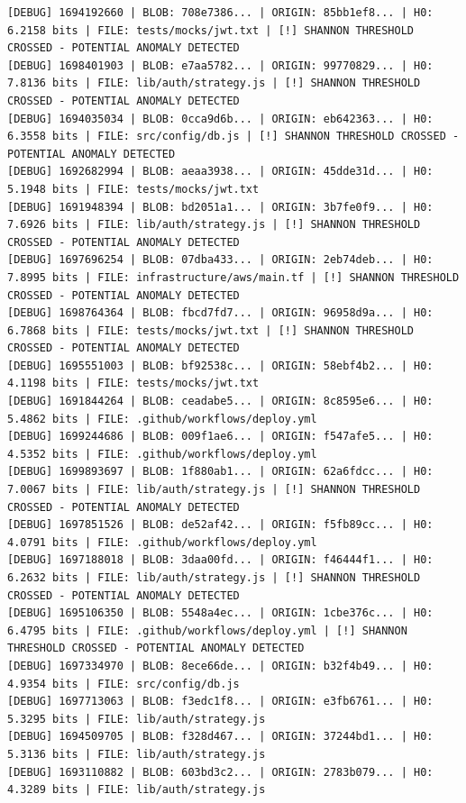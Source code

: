 \documentclass[12pt, a4paper, oneside]{report}
\begin{document}
\begin{lstlisting}[basicstyle=\tiny\ttfamily]
[DEBUG] 1694192660 | BLOB: 708e7386... | ORIGIN: 85bb1ef8... | H0: 6.2158 bits | FILE: tests/mocks/jwt.txt | [!] SHANNON THRESHOLD CROSSED - POTENTIAL ANOMALY DETECTED
[DEBUG] 1698401903 | BLOB: e7aa5782... | ORIGIN: 99770829... | H0: 7.8136 bits | FILE: lib/auth/strategy.js | [!] SHANNON THRESHOLD CROSSED - POTENTIAL ANOMALY DETECTED
[DEBUG] 1694035034 | BLOB: 0cca9d6b... | ORIGIN: eb642363... | H0: 6.3558 bits | FILE: src/config/db.js | [!] SHANNON THRESHOLD CROSSED - POTENTIAL ANOMALY DETECTED
[DEBUG] 1692682994 | BLOB: aeaa3938... | ORIGIN: 45dde31d... | H0: 5.1948 bits | FILE: tests/mocks/jwt.txt
[DEBUG] 1691948394 | BLOB: bd2051a1... | ORIGIN: 3b7fe0f9... | H0: 7.6926 bits | FILE: lib/auth/strategy.js | [!] SHANNON THRESHOLD CROSSED - POTENTIAL ANOMALY DETECTED
[DEBUG] 1697696254 | BLOB: 07dba433... | ORIGIN: 2eb74deb... | H0: 7.8995 bits | FILE: infrastructure/aws/main.tf | [!] SHANNON THRESHOLD CROSSED - POTENTIAL ANOMALY DETECTED
[DEBUG] 1698764364 | BLOB: fbcd7fd7... | ORIGIN: 96958d9a... | H0: 6.7868 bits | FILE: tests/mocks/jwt.txt | [!] SHANNON THRESHOLD CROSSED - POTENTIAL ANOMALY DETECTED
[DEBUG] 1695551003 | BLOB: bf92538c... | ORIGIN: 58ebf4b2... | H0: 4.1198 bits | FILE: tests/mocks/jwt.txt
[DEBUG] 1691844264 | BLOB: ceadabe5... | ORIGIN: 8c8595e6... | H0: 5.4862 bits | FILE: .github/workflows/deploy.yml
[DEBUG] 1699244686 | BLOB: 009f1ae6... | ORIGIN: f547afe5... | H0: 4.5352 bits | FILE: .github/workflows/deploy.yml
[DEBUG] 1699893697 | BLOB: 1f880ab1... | ORIGIN: 62a6fdcc... | H0: 7.0067 bits | FILE: lib/auth/strategy.js | [!] SHANNON THRESHOLD CROSSED - POTENTIAL ANOMALY DETECTED
[DEBUG] 1697851526 | BLOB: de52af42... | ORIGIN: f5fb89cc... | H0: 4.0791 bits | FILE: .github/workflows/deploy.yml
[DEBUG] 1697188018 | BLOB: 3daa00fd... | ORIGIN: f46444f1... | H0: 6.2632 bits | FILE: lib/auth/strategy.js | [!] SHANNON THRESHOLD CROSSED - POTENTIAL ANOMALY DETECTED
[DEBUG] 1695106350 | BLOB: 5548a4ec... | ORIGIN: 1cbe376c... | H0: 6.4795 bits | FILE: .github/workflows/deploy.yml | [!] SHANNON THRESHOLD CROSSED - POTENTIAL ANOMALY DETECTED
[DEBUG] 1697334970 | BLOB: 8ece66de... | ORIGIN: b32f4b49... | H0: 4.9354 bits | FILE: src/config/db.js
[DEBUG] 1697713063 | BLOB: f3edc1f8... | ORIGIN: e3fb6761... | H0: 5.3295 bits | FILE: lib/auth/strategy.js
[DEBUG] 1694509705 | BLOB: f328d467... | ORIGIN: 37244bd1... | H0: 5.3136 bits | FILE: lib/auth/strategy.js
[DEBUG] 1693110882 | BLOB: 603bd3c2... | ORIGIN: 2783b079... | H0: 4.3289 bits | FILE: lib/auth/strategy.js

\end{lstlisting}
\end{document}
